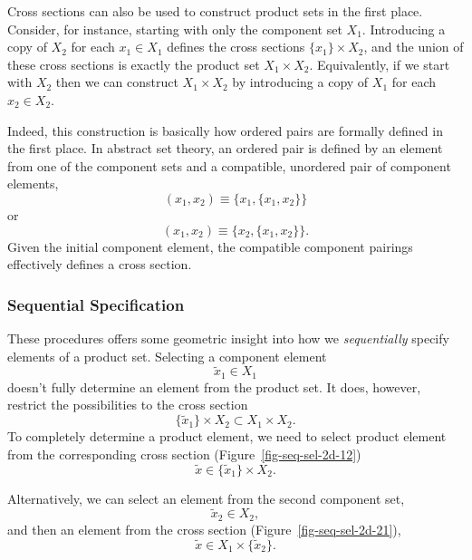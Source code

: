 \documentclass[
  letterpaper,
  DIV=11,
  numbers=noendperiod]{scrartcl}
\begin{document}
Cross sections can also be used to construct product sets in the first
place. Consider, for instance, starting with only the component set
\(X_{1}\). Introducing a copy of \(X_{2}\) for each \(x_{1} \in X_{1}\)
defines the cross sections \(\{ x_{1} \} \times X_{2}\), and the union
of these cross sections is exactly the product set
\(X_{1} \times X_{2}\). Equivalently, if we start with \(X_{2}\) then we
can construct \(X_{1} \times X_{2}\) by introducing a copy of \(X_{1}\)
for each \(x_{2} \in X_{2}\).

Indeed, this construction is basically how ordered pairs are formally
defined in the first place. In abstract set theory, an ordered pair is
defined by an element from one of the component sets and a compatible,
unordered pair of component elements, \[
( x_{1}, x_{2} ) \equiv \{ x_{1}, \{ x_{1}, x_{2} \} \}
\] or \[
( x_{1}, x_{2} ) \equiv \{ x_{2}, \{ x_{1}, x_{2} \} \}.
\] Given the initial component element, the compatible component
pairings effectively defines a cross section.

\subsubsection{Sequential Specification}\label{sequential-specification}

These procedures offers some geometric insight into how we
\emph{sequentially} specify elements of a product set. Selecting a
component element \[
\tilde{x}_{1} \in X_{1}
\] doesn't fully determine an element from the product set. It does,
however, restrict the possibilities to the cross section \[
\{ \tilde{x}_{1} \} \times X_{2} \subset X_{1} \times X_{2}.
\] To completely determine a product element, we need to select product
element from the corresponding cross section
(Figure~\ref{fig-seq-sel-2d-12}) \[
\tilde{x} \in \{ \tilde{x}_{1} \} \times X_{2}.
\]

Alternatively, we can select an element from the second component set,
\[
\tilde{x}_{2} \in X_{2},
\] and then an element from the cross section
(Figure~\ref{fig-seq-sel-2d-21}), \[
\tilde{x} \in X_{1} \times \{ \tilde{x}_{2} \}.
\]
\end{document}
